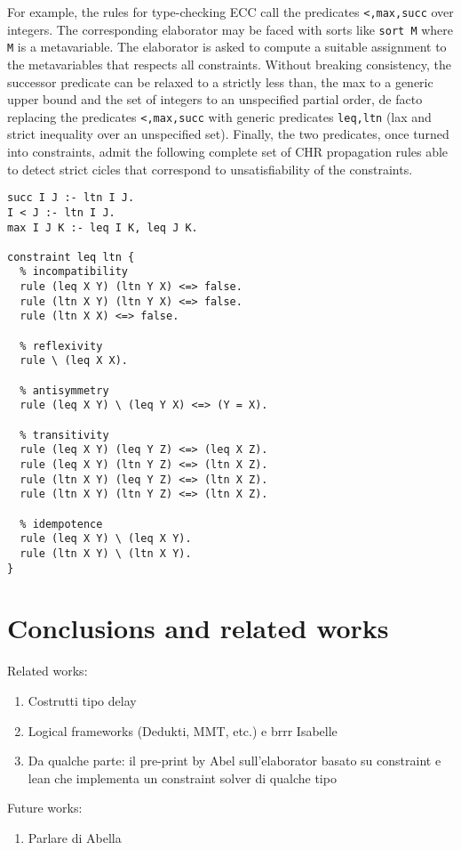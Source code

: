 \documentclass{easychair}
\begin{document}
For example, the rules for type-checking ECC call the predicates \verb+<,max,succ+ over integers. The corresponding elaborator may be faced with sorts like \verb+sort M+ where \verb+M+ is a metavariable. The elaborator is asked to compute a suitable assignment to the metavariables that respects all constraints. Without breaking consistency, the successor predicate can be relaxed to a strictly less than, the max to a generic upper bound and the set of integers to an unspecified partial order, de facto replacing the predicates \verb+<,max,succ+ with generic predicates \verb+leq,ltn+ (lax and strict inequality over an unspecified set). Finally, the two predicates, once turned into constraints, admit the following complete set of CHR propagation rules able to detect strict cicles that correspond to unsatisfiability of the constraints.

\label{chruniverses}
\begin{verbatim}
succ I J :- ltn I J.
I < J :- ltn I J.
max I J K :- leq I K, leq J K.

constraint leq ltn {
  % incompatibility
  rule (leq X Y) (ltn Y X) <=> false.
  rule (ltn X Y) (ltn Y X) <=> false.
  rule (ltn X X) <=> false.
  
  % reflexivity
  rule \ (leq X X).

  % antisymmetry
  rule (leq X Y) \ (leq Y X) <=> (Y = X).

  % transitivity
  rule (leq X Y) (leq Y Z) <=> (leq X Z).
  rule (leq X Y) (ltn Y Z) <=> (ltn X Z).
  rule (ltn X Y) (leq Y Z) <=> (ltn X Z).
  rule (ltn X Y) (ltn Y Z) <=> (ltn X Z).

  % idempotence
  rule (leq X Y) \ (leq X Y).
  rule (ltn X Y) \ (ltn X Y).
}
\end{verbatim}


\section{Conclusions and related works}\label{sec:conclusion}
Related works:
\begin{enumerate}
\item Costrutti tipo delay
\item Logical frameworks (Dedukti, MMT, etc.) e brrr Isabelle
\item Da qualche parte: il pre-print by Abel sull'elaborator basato su
 constraint e lean che implementa un constraint solver di qualche tipo
\end{enumerate}

Future works:
\begin{enumerate}
\item Parlare di Abella
\end{enumerate}

\label{sect:bib}


\end{document}
